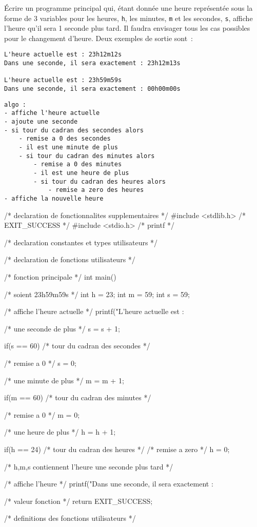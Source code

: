 Écrire un programme principal qui, étant donnée une heure représentée
sous la forme de 3 variables pour les heures, \verb|h|, les minutes,
\verb|m| et les secondes, \verb|s|, affiche l'heure qu'il sera 1
seconde plus tard. Il faudra envisager tous les
cas possibles pour le changement d'heure. Deux exemples de sortie sont~:

\begin{verbatim}
L'heure actuelle est : 23h12m12s
Dans une seconde, il sera exactement : 23h12m13s

L'heure actuelle est : 23h59m59s
Dans une seconde, il sera exactement : 00h00m00s
\end{verbatim}

\begin{correction}
\begin{verbatim}
algo :
- affiche l'heure actuelle
- ajoute une seconde
- si tour du cadran des secondes alors
    - remise a 0 des secondes
    - il est une minute de plus
    - si tour du cadran des minutes alors
        - remise a 0 des minutes
        - il est une heure de plus
        - si tour du cadran des heures alors
    	    - remise a zero des heures
- affiche la nouvelle heure
\end{verbatim}
  \begin{listing}{1}
/* declaration de fonctionnalites supplementaires */
#include <stdlib.h> /* EXIT_SUCCESS */
#include <stdio.h> /* printf */

/* declaration constantes et types utilisateurs */

/* declaration de fonctions utilisateurs */

/* fonction principale */
int main()
{
    /* soient 23h59m59s */
    int h = 23;
    int m = 59;
    int s = 59;

    /* affiche l'heure actuelle */
    printf("L'heure actuelle est : %

    /* une seconde de plus */
    s = s + 1;

    if(s == 60) /* tour du cadran des secondes */
    {
	/* remise a 0 */
	s = 0;

	/* une minute de plus */
	m = m + 1;

	if(m == 60) /* tour du cadran des minutes */
	{
	    /* remise a 0 */
	    m = 0;

	    /* une heure de plus */
	    h = h + 1;

	    if(h == 24) /* tour du cadran des heures */
	    {
		/* remise a zero */
		h = 0;
	    }
	}
    }
    /* h,m,s contiennent l'heure une seconde plus tard */

    /* affiche l'heure */
    printf("Dans une seconde, il sera exactement : %

    /* valeur fonction */
    return EXIT_SUCCESS;
}

/* definitions des fonctions utilisateurs */
  \end{listing}
\end{correction}


